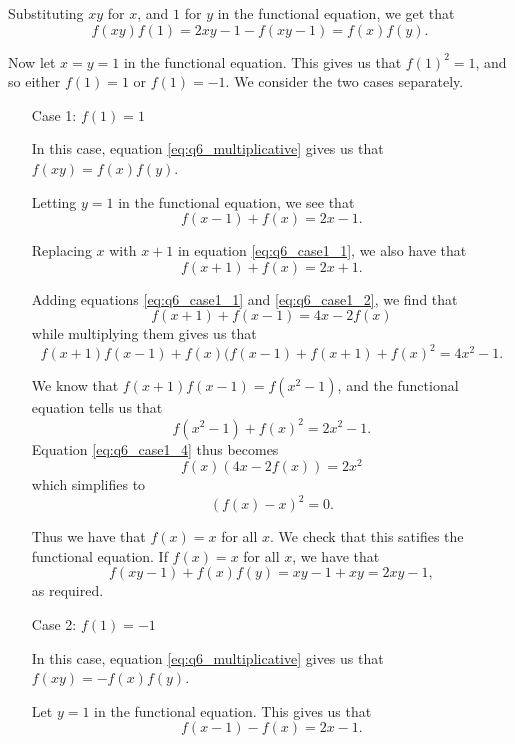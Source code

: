 \documentclass[12pt]{article}
\begin{document}
\begin{enumerate}
Substituting $xy$ for $x$, and $1$ for $y$ in the functional equation, we get
that
\begin{equation} \label{eq:q6_multiplicative}
    f(xy) f(1) = 2xy - 1 - f(xy - 1) = f(x) f(y).
\end{equation}

Now let $x = y = 1$ in the functional equation. This gives us that $f(1)^2 = 1$,
and so either $f(1) = 1$ or $f(1) = -1$. We consider the two cases separately.

\begin{enumerate}

\item[Case 1:] $f(1) = 1$

In this case, equation \ref{eq:q6_multiplicative} gives us that $f(xy) = f(x)
f(y)$.

Letting $y = 1$ in the functional equation, we see that
\begin{equation} \label{eq:q6_case1_1}
    f(x - 1) + f(x) = 2x - 1.
\end{equation}

Replacing $x$ with $x + 1$ in equation \ref{eq:q6_case1_1}, we also have that
\begin{equation} \label{eq:q6_case1_2}
    f(x + 1) + f(x) = 2x + 1.
\end{equation}

Adding equations \ref{eq:q6_case1_1} and \ref{eq:q6_case1_2}, we find that
\[
    f(x + 1) + f(x - 1) = 4x - 2f(x)
\]
while multiplying them gives us that
\begin{equation} \label{eq:q6_case1_4}
    f(x + 1) f(x - 1) + f(x) (f(x - 1) + f(x + 1) + f(x)^2 = 4x^2 - 1.
\end{equation}

We know that $f(x + 1) f(x - 1) = f(x^2 - 1)$, and the functional equation tells
us that
\[
    f(x^2 - 1) + f(x)^2 = 2x^2 - 1.
\]
Equation \ref{eq:q6_case1_4} thus becomes
\[
    f(x) (4x - 2f(x)) = 2x^2
\]
which simplifies to
\[
    (f(x) - x)^2 = 0.
\]

Thus we have that $f(x) = x$ for all $x$. We check that this satifies the
functional equation. If $f(x) = x$ for all $x$, we have that
\[
    f(xy - 1) + f(x) f(y) = xy - 1 + xy = 2xy - 1,
\]
as required.

\item[Case 2:] $f(1) = -1$

In this case, equation \ref{eq:q6_multiplicative} gives us that $f(xy) = -f(x)
f(y)$.

Let $y = 1$ in the functional equation. This gives us that
\begin{equation} \label{eq:q6_case2_1}
    f(x - 1) - f(x) = 2x - 1.
\end{equation}


\end{enumerate}
\end{enumerate}
\end{document}
